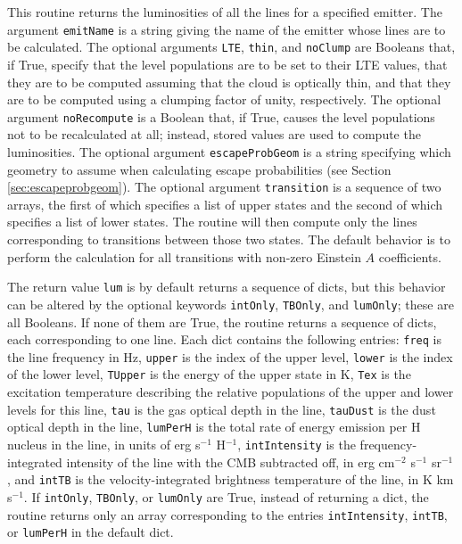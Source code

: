 \documentclass[12pt]{article}
\begin{document}
This routine returns the luminosities of all the lines for a specified emitter. The argument \verb=emitName= is a string giving the name of the emitter whose lines are to be calculated. The optional arguments \verb=LTE=, \verb=thin=, and \verb=noClump= are Booleans that, if True, specify that the level populations are to be set to their LTE values, that they are to be computed assuming that the cloud is optically thin, and that they are to be computed using a clumping factor of unity, respectively. The optional argument \verb=noRecompute= is a Boolean that, if True, causes the level populations not to be recalculated at all; instead, stored values are used to compute the luminosities. The optional argument \verb=escapeProbGeom= is a string specifying which geometry to assume when calculating escape probabilities (see Section \ref{sec:escapeprobgeom}). The optional argument \verb=transition= is a sequence of two arrays, the first of which specifies a list of upper states and the second of which specifies a list of lower states. The routine will then compute only the lines corresponding to transitions between those two states. The default behavior is to perform the calculation for all transitions with non-zero Einstein $A$ coefficients.

The return value \verb=lum= is by default returns a sequence of dicts, but this behavior can be altered by the optional keywords \verb=intOnly=, \verb=TBOnly=, and \verb=lumOnly=; these are all Booleans. If none of them are True, the routine returns a sequence of dicts, each corresponding to one line. Each dict contains the following entries: \verb=freq= is the line frequency in Hz, \verb=upper= is the index of the upper level, \verb=lower= is the index of the lower level, \verb=TUpper= is the energy of the upper state in K, \verb=Tex= is the excitation temperature describing the relative populations of the upper and lower levels for this line, \verb=tau= is the gas optical depth in the line, \verb=tauDust= is the dust optical depth in the line, \verb=lumPerH= is the total rate of energy emission per H nucleus in the line, in units of erg s$^{-1}$ H$^{-1}$, \verb=intIntensity= is the frequency-integrated intensity of the line with the CMB subtracted off, in erg cm$^{-2}$ s$^{-1}$ sr$^{-1}$, and \verb=intTB= is the velocity-integrated brightness temperature of the line, in K km s$^{-1}$. If \verb=intOnly=, \verb=TBOnly=, or \verb=lumOnly= are True, instead of returning a dict, the routine returns only an array corresponding to the entries \verb=intIntensity=, \verb=intTB=, or \verb=lumPerH= in the default dict.
\end{document}
